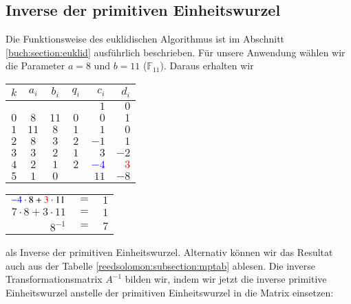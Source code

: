
\subsection{Inverse der primitiven Einheitswurzel
\label{reedsolomon:subsection:invEinh}}

Die Funktionsweise des euklidischen Algorithmus ist im Abschnitt \ref{buch:section:euklid} ausführlich beschrieben.
Für unsere Anwendung wählen wir die Parameter $a = 8$ und $b = 11$ ($\mathbb{F}_{11}$).
Daraus erhalten wir 

\begin{center}

\begin{tabular}{| c | c c | c | r r |}
	\hline
	$k$ & $a_i$ & $b_i$ & $q_i$ & $c_i$ & $d_i$\\
	\hline 
	& & & & $1$& $0$\\
	$0$& $8$& $11$& $0$& $0$& $1$\\
	$1$& $11$& $8$& $1$& $1$& $0$\\
	$2$& $8$& $3$& $2$& $-1$& $1$\\
	$3$& $3$& $2$& $1$& $3$& $-2$\\
	$4$& $2$& $1$& $2$& \textcolor{blue}{$-4$}& \textcolor{red}{$3$}\\
	$5$& $1$& $0$& & $11$& $-8$\\
	\hline
\end{tabular}

\end{center}
\begin{center}

\begin{tabular}{rcl}
	$\textcolor{blue}{-4} \cdot 8 + \textcolor{red}{3} \cdot 11$ &$=$& $1$\\
	$7 \cdot 8 + 3 \cdot 11$ &$=$& $1$\\
	$8^{-1}$ &$=$& $7$
	
\end{tabular}

\end{center}
als Inverse der primitiven Einheitswurzel.
Alternativ können wir das Resultat auch aus der Tabelle \ref{reedsolomon:subsection:mptab} ablesen.
Die inverse Transformationsmatrix $A^{-1}$ bilden wir, indem wir jetzt die inverse primitive Einheitswurzel anstelle der primitiven Einheitswurzel in die Matrix einsetzen:
